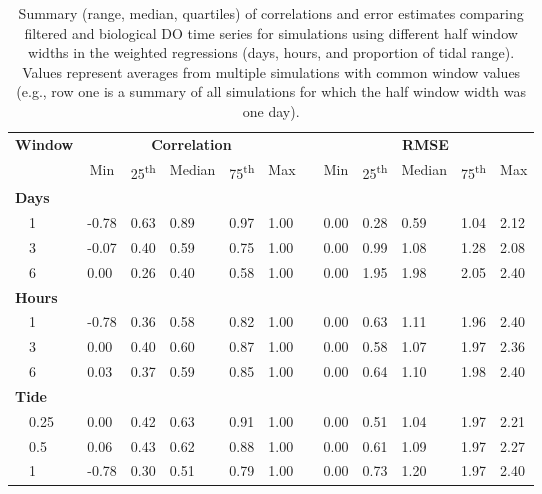 \documentclass[letterpaper,12pt,oneside]{article}\usepackage[]{graphicx}\usepackage[]{color}
\begin{document}
%
\begin{table}[!tbp]
\caption{Summary (range, median, quartiles) of correlations and error estimates comparing filtered and biological \ac{DO} time series for simulations using different half window widths in the weighted regressions (days, hours, and proportion of tidal range).  Values represent averages from multiple simulations with common window values (e.g., row one is a summary of all simulations for which the half window width was one day).\label{tab:dtd_perf2}} 
\begin{center}
\begin{tabular}{llllllclllll}
\hline\hline
\multicolumn{1}{l}{\bfseries Window}&\multicolumn{5}{c}{\bfseries Correlation}&\multicolumn{1}{c}{\bfseries }&\multicolumn{5}{c}{\bfseries RMSE}\tabularnewline
\cline{2-6} \cline{8-12}
\multicolumn{1}{l}{}&\multicolumn{1}{c}{Min}&\multicolumn{1}{c}{25\textsuperscript{th}}&\multicolumn{1}{c}{Median}&\multicolumn{1}{c}{75\textsuperscript{th}}&\multicolumn{1}{c}{Max}&\multicolumn{1}{c}{}&\multicolumn{1}{c}{Min}&\multicolumn{1}{c}{25\textsuperscript{th}}&\multicolumn{1}{c}{Median}&\multicolumn{1}{c}{75\textsuperscript{th}}&\multicolumn{1}{c}{Max}\tabularnewline
\hline
{\bfseries Days}&&&&&&&&&&&\tabularnewline
~~1&-0.78&0.63&0.89&0.97&1.00&&0.00&0.28&0.59&1.04&2.12\tabularnewline
~~3&-0.07&0.40&0.59&0.75&1.00&&0.00&0.99&1.08&1.28&2.08\tabularnewline
~~6& 0.00&0.26&0.40&0.58&1.00&&0.00&1.95&1.98&2.05&2.40\tabularnewline
\hline
{\bfseries Hours}&&&&&&&&&&&\tabularnewline
~~1&-0.78&0.36&0.58&0.82&1.00&&0.00&0.63&1.11&1.96&2.40\tabularnewline
~~3& 0.00&0.40&0.60&0.87&1.00&&0.00&0.58&1.07&1.97&2.36\tabularnewline
~~6& 0.03&0.37&0.59&0.85&1.00&&0.00&0.64&1.10&1.98&2.40\tabularnewline
\hline
{\bfseries Tide}&&&&&&&&&&&\tabularnewline
~~0.25& 0.00&0.42&0.63&0.91&1.00&&0.00&0.51&1.04&1.97&2.21\tabularnewline
~~0.5& 0.06&0.43&0.62&0.88&1.00&&0.00&0.61&1.09&1.97&2.27\tabularnewline
~~1&-0.78&0.30&0.51&0.79&1.00&&0.00&0.73&1.20&1.97&2.40\tabularnewline
\hline
\end{tabular}
\end{center}
\end{table}
\end{document}
